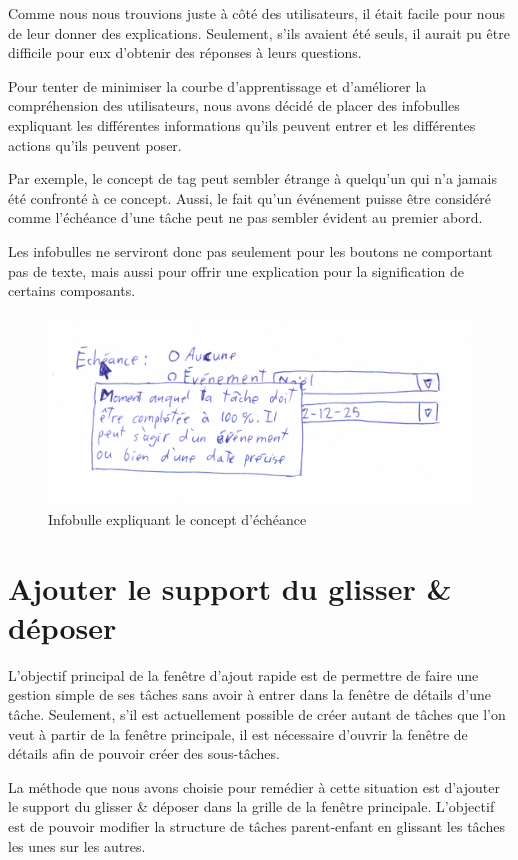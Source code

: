 \documentclass[letterpaper, oneside, 12pt, these, creativecommons]{thETS}
\begin{document}
Comme nous nous trouvions juste à côté des utilisateurs, il était facile pour nous de leur donner des explications. Seulement, s'ils avaient été seuls, il aurait pu être difficile pour eux d'obtenir des réponses à leurs questions.

Pour tenter de minimiser la courbe d'apprentissage et d'améliorer la compréhension des utilisateurs, nous avons décidé de placer des infobulles expliquant les différentes informations qu'ils peuvent entrer et les différentes actions qu'ils peuvent poser.

Par exemple, le concept de tag peut sembler étrange à quelqu'un qui n'a jamais été confronté à ce concept. Aussi, le fait qu'un événement puisse être considéré comme l'échéance d'une tâche peut ne pas sembler évident au premier abord.

Les infobulles ne serviront donc pas seulement pour les boutons ne comportant pas de texte, mais aussi pour offrir une explication pour la signification de certains composants.

\begin{figure}
    \includegraphics[scale=0.2]{infobulle.png}
    \caption{Infobulle expliquant le concept d'échéance}
\end{figure}

\section{Ajouter le support du glisser \& déposer}

L'objectif principal de la fenêtre d'ajout rapide est de permettre de faire une gestion simple de ses tâches sans avoir à entrer dans la fenêtre de détails d'une tâche. Seulement, s'il est actuellement possible de créer autant de tâches que l'on veut à partir de la fenêtre principale, il est nécessaire d'ouvrir la fenêtre de détails afin de pouvoir créer des sous-tâches.

La méthode que nous avons choisie pour remédier à cette situation est d'ajouter le support du glisser \& déposer dans la grille de la fenêtre principale. L'objectif est de pouvoir modifier la structure de tâches parent-enfant en glissant les tâches les unes sur les autres.
\end{document}
